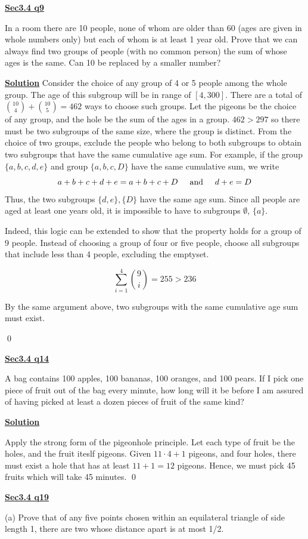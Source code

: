 \documentclass{article}
\newcommand{\new}[1]{
    \vspace{2mm}
    \noindent
    \textbf{
    \underline{#1}}
}
\newcommand{\textAnd}{
    {
        \hspace{5mm}
        \textrm{and}
        \hspace{5mm}
    }
}
\newcommand{\m}{
    \cdot
}
\begin{document}
\new{Sec3.4 q9}
In a room there are 10 people, none of whom are older than 60 (ages are given in 
whole numbers only) but each of whom is at least 1 year old. Prove that we can 
always find two groups of people (with no common person) the sum of whose 
ages is the same. Can 10 be replaced by a smaller number?

\new{Solution} Consider the choice of any group of 4 or 5 people among 
the whole group. The age of this subgroup will be in range of $[4, 300]$. 
There are a total of $\binom{10}{4} + \binom{10}{5} = 462$ ways to choose such 
groups. Let the pigeons be the choice of any group, and the hole be the 
sum of the ages in a group. $462 > 297$ so there must be two subgroups of 
the same size, where the group is distinct. From the choice of two groups, 
exclude the people who belong to both subgroups to obtain two subgroups that 
have the same cumulative age sum. For example, if the group $\{a, b, c, d, e\}$ and 
group $\{a, b, c, D\}$ have the same cumulative sum, we write
\[
    a + b+ c+d+e = a+b+c+D \textAnd d+e = D
\]
Thus, the two subgroups $\{d, e\}, \{D\}$ have the same age sum. 
Since all people are aged at least one years old, it is impossible to have 
to subgroups $\emptyset$, $\{a\}$. 

Indeed, this logic can be extended to show that the property holds 
for a group of 9 people. Instead of choosing a group of four or five 
people, choose all subgroups that include less than 4 people, excluding the 
emptyset. 

\[
    \sum_{i = 1}^{4} \binom{9}{i} = 255 > 236
\]

By the same argument above, two subgroups with the same cumulative age sum 
must exist. 

\hfill \qed

\new{Sec3.4 q14}
A bag contains 100 apples, 100 bananas, 100 oranges, and 100 pears. If I pick 
one piece of fruit out of the bag every minute, how long will it be before I am 
assured of having picked at least a dozen pieces of fruit of the same kind?

\new{Solution}
Apply the strong form of the pigeonhole principle. Let each type of 
fruit be the holes, and the fruit iteslf pigeons. Given $11\m4+1$ pigeons, 
and four holes, there must exist a hole that has at least $11 + 1 = 12$ 
pigeons. Hence, we must pick 45 fruits which will take 45 minutes.
\hfill \qed

\new{Sec3.4 q19}

(a) Prove that of any five points chosen within an equilateral triangle of side 
length 1, there are two whose distance apart is at most 1/2. 
\end{document}

